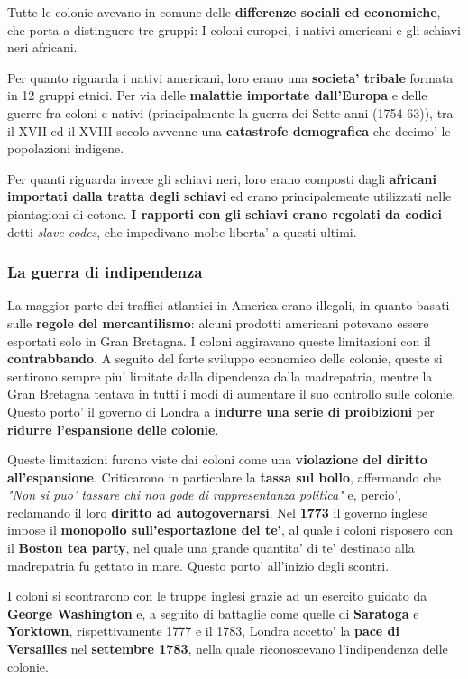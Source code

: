 \documentclass{article}
\begin{document}
{{    Tutte le colonie avevano in comune delle \textbf{differenze sociali ed economiche}, che porta a distinguere tre gruppi: I coloni europei, i nativi americani e gli schiavi neri africani.

    Per quanto riguarda i nativi americani, loro erano una \textbf{societa' tribale} formata in 12 gruppi etnici. Per via delle \textbf{malattie importate dall'Europa} e delle guerre fra coloni e nativi \small{(principalmente la guerra dei Sette anni (1754-63))}, tra il XVII ed il XVIII secolo avvenne una \textbf{catastrofe demografica} che decimo' le popolazioni indigene.

    Per quanti riguarda invece gli schiavi neri, loro erano composti dagli \textbf{africani importati dalla tratta degli schiavi} ed erano principalemente utilizzati nelle piantagioni di cotone. \textbf{I rapporti con gli schiavi erano regolati da codici} detti \textit{slave codes}, che impedivano molte liberta' a questi ultimi.

    \subsubsection{La guerra di indipendenza} %
    La maggior parte dei traffici atlantici in America erano illegali, in quanto basati sulle \textbf{regole del mercantilismo}: alcuni prodotti americani potevano essere esportati solo in Gran Bretagna. I coloni aggiravano queste limitazioni con il \textbf{contrabbando}. A seguito del forte sviluppo economico delle colonie, queste si sentirono sempre piu' limitate dalla dipendenza dalla madrepatria, mentre la Gran Bretagna tentava in tutti i modi di aumentare il suo controllo sulle colonie. Questo porto' il governo di Londra a \textbf{indurre una serie di proibizioni} per \textbf{ridurre l'espansione delle colonie}.

    Queste limitazioni furono viste dai coloni come una \textbf{violazione del diritto all'espansione}. Criticarono in particolare la \textbf{tassa sul bollo}, affermando che \textit{"Non si puo' tassare chi non gode di rappresentanza politica"} e, percio', reclamando il loro \textbf{diritto ad autogovernarsi}. Nel \textbf{1773} il governo inglese impose il \textbf{monopolio sull'esportazione del te'}, al quale i coloni risposero con il \textbf{Boston tea party}, nel quale una grande quantita' di te' destinato alla madrepatria fu gettato in mare. Questo porto' all'inizio degli scontri.

    I coloni si scontrarono con le truppe inglesi grazie ad un esercito guidato da \textbf{George Washington} e, a seguito di battaglie come quelle di \textbf{Saratoga} e \textbf{Yorktown}, rispettivamente 1777 e il 1783, Londra accetto' la \textbf{pace di Versailles} nel \textbf{settembre 1783}, nella quale riconoscevano l'indipendenza delle colonie.

}}
\end{document}
